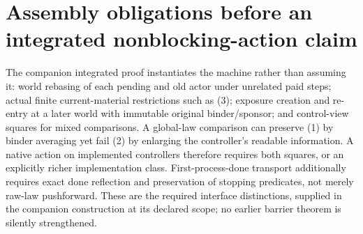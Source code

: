 \documentclass{article}
\begin{document}
\section{Assembly obligations before an integrated nonblocking-action claim}
The companion integrated proof instantiates the machine rather than assuming it: world rebasing of each pending and old actor under unrelated paid steps; actual finite current-material restrictions such as (3); exposure creation and re-entry at a later world with immutable original binder/sponsor; and control-view squares for mixed comparisons. A global-law comparison can preserve (1) by binder averaging yet fail (2) by enlarging the controller's readable information. A native action on implemented controllers therefore requires both squares, or an explicitly richer implementation class. First-process-done transport additionally requires exact done reflection and preservation of stopping predicates, not merely raw-law pushforward. These are the required interface distinctions, supplied in the companion construction at its declared scope; no earlier barrier theorem is silently strengthened.
\end{document}
